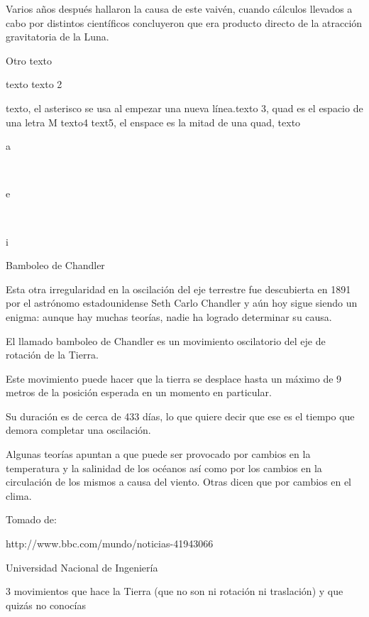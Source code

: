 \documentclass[12pt,a4paer]{article}
\begin{document}
Varios años después hallaron la causa de este vaivén, cuando cálculos llevados a cabo por distintos científicos 
concluyeron que era producto directo de la atracción gravitatoria de la Luna.


\vspace{4cm} %

Otro texto


\newpage

\vspace*{4cm} %

texto\hspace{3cm} texto 2

\hspace*{5cm} texto, el asterisco se usa al empezar una nueva línea.\quad texto 3, quad es el espacio de una letra M texto4 \qquad text5, el enspace es la mitad de una quad, \enspace texto

\newpage

a

\

e

\

i


Bamboleo de Chandler

Esta otra irregularidad en la oscilación del eje terrestre fue descubierta en 1891 por el astrónomo estadounidense 
Seth Carlo Chandler y aún hoy sigue siendo un enigma: aunque hay muchas teorías, nadie ha logrado determinar su causa.

El llamado bamboleo de Chandler es un movimiento oscilatorio del eje de rotación de la Tierra.

Este movimiento puede hacer que la tierra se desplace hasta un máximo de 9 metros de la posición esperada en un 
momento en particular.

Su duración es de cerca de 433 días, lo que quiere decir que ese es el tiempo que demora completar una oscilación.

Algunas teorías apuntan a que puede ser provocado por cambios en la temperatura y la salinidad de los océanos así 
como por los cambios en la circulación de los mismos a causa del viento. Otras dicen que por cambios en el clima.




Tomado de:

http://www.bbc.com/mundo/noticias-41943066

Universidad Nacional de Ingeniería

3 movimientos que hace la Tierra (que no son ni rotación ni traslación) 
y que quizás no conocías
\end{document}
